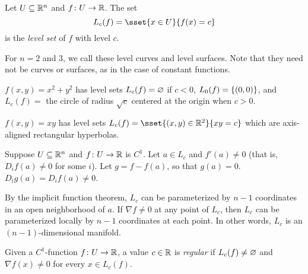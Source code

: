 
\begin{definition} \label{def:level}
    Let $U \subseteq \mathbb{R}^n$ and $f\colon U \to \mathbb{R}$.
    The set \[
        L_c(f) = \sset{x \in U}{f(x) = c}
    \] is the \emph{level set} of $f$ with level $c$.
\end{definition}
\begin{remark}
    For $n = 2$ and $3$, we call these level curves and level surfaces.
    Note that they need not be curves or surfaces, as in the case of
    constant functions.
\end{remark}
\begin{examples}
    \item $f(x, y) = x^2 + y^2$ has level sets $L_c(f) = \varnothing$ if $c < 0$,
    $L_0(f) = \{(0, 0)\}$, and $L_c(f) = $ the circle of radius $\sqrt c$
    centered at the origin when $c > 0$.
    \item $f(x, y) = xy$ has level sets $L_c(f) = \sset{(x, y) \in \R^2}
    {xy = c}$ which are axis-aligned rectangular hyperbolas.
\end{examples}

Suppose $U \subseteq \mathbb{R}^n$ and $f\colon U \to \mathbb{R}$ is $C^1$.
Let $a \in L_c$ and $f'(a) \ne 0$ (that is, $D_if(a) \ne 0$ for some $i$).
Let $g = f - f(a)$, so that $g(a) = 0$.
$D_ig(a) = D_if(a) \ne 0$.

By the implicit function theorem, $L_c$ can be parameterized by $n-1$
coordinates in an open neighborhood of $a$.
If $\nabla f \ne 0$ at any point of $L_c$, then $L_c$ can be parameterized
locally by $n-1$ coordinates at each point.
In other words, $L_c$ is an $(n-1)$-dimensional manifold.

\begin{definition}[regularity] \label{def:regular}
    Given a $C^1$-function $f\colon U \to \mathbb{R}$, a value $c \in \mathbb{R}$ is
    \emph{regular} if $L_c(f) \ne \varnothing$ and $\nabla f(x) \ne 0$ for every
    $x \in L_c(f)$.
\end{definition}
